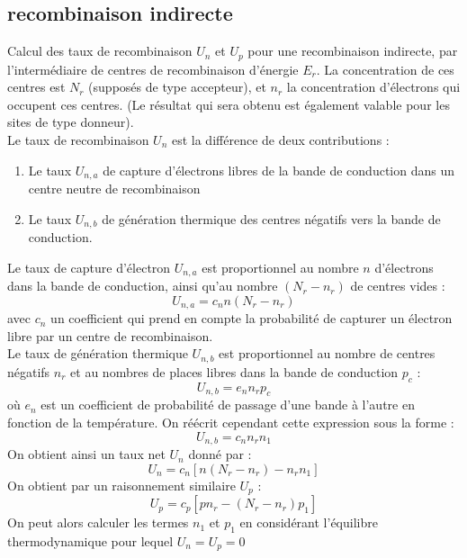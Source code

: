 \subsection{recombinaison indirecte}
Calcul des taux de recombinaison $U_n$ et $U_p$ pour une recombinaison indirecte, par l'intermédiaire de centres de recombinaison d'énergie $E_r$. La concentration de ces centres est $N_r$ (supposés de type accepteur), et $n_r$ la concentration d'électrons qui occupent ces centres. (Le résultat qui sera obtenu est également valable pour les sites de type donneur).\\
Le taux de recombinaison $U_n$ est la différence de deux contributions :
\begin{enumerate}
\item Le taux $U_{n,a}$ de capture d'électrons libres de la bande de conduction dans un centre neutre de recombinaison
\item Le taux $U_{n,b}$ de génération thermique des centres négatifs vers la bande de conduction.
\end{enumerate}
Le taux de capture d'électron $U_{n,a}$ est proportionnel au nombre $n$ d'électrons dans la bande de conduction, ainsi qu'au nombre $(N_r-n_r)$ de centres vides : 
\begin{equation}
U_{n,a}=c_n n (N_r-n_r)
\end{equation}
avec $c_n$ un coefficient qui prend en compte la probabilité de capturer un électron libre par un centre de recombinaison. \\
Le taux de génération thermique $U_{n,b}$ est proportionnel au nombre de centres négatifs $n_r$ et au nombres de places libres dans la bande de conduction $p_c$ :
\begin{equation}
U_{n,b}=e_nn_rp_c
\end{equation}
où $e_n$ est un coefficient de probabilité de passage d'une bande à l'autre en fonction de la température. On réécrit cependant cette expression sous la forme :
\begin{equation}
U_{n,b}=c_nn_rn_1
\end{equation}
On obtient ainsi un taux net $U_n$ donné par :
\begin{equation}
U_n=c_n[n(N_r-n_r)-n_rn_1]
\end{equation}
On obtient par un raisonnement similaire $U_p$ :
\begin{equation}
U_p=c_p[pn_r-(N_r-n_r)p_1] 
\end{equation}
On peut alors calculer les termes $n_1$ et $p_1$ en considérant l'équilibre thermodynamique pour lequel $U_n=U_p=0$
